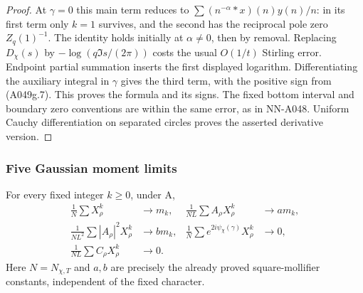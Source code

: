 \begin{proof}
At $\gamma=0$ this main term reduces to
$\sum (n^{-\alpha}*x)(n)y(n)/n$: in its first term only
$k=1$ survives, and the second has the reciprocal pole zero
$Z_q(1)^{-1}$. The identity holds initially at $\alpha\ne0$,
then by removal. Replacing $D_\chi(s)$ by
$-\log(q\Im s/(2\pi))$ costs the usual $O(1/t)$ Stirling
error. Endpoint partial summation inserts the first displayed
logarithm. Differentiating the auxiliary integral in $\gamma$
gives the third term, with the positive sign from (A049g.7).
This proves the formula and its signs. The fixed bottom interval
and boundary zero conventions are within the same error, as in
NN-A048. Uniform Cauchy differentiation on separated circles
proves the asserted derivative version.
\end{proof}

\subsubsection*{Five Gaussian moment limits}

\begin{lemma}
\label{lem:A049-gaussian-moments}
For every fixed integer $k\ge0$, under A,
\begin{align}
 \frac1N\sum X_\rho^k&\longrightarrow m_k,
 &\frac1{NL}\sum A_\rho X_\rho^k&\longrightarrow a m_k,
                                                        \tag{A049g.9}\\
 \frac1{NL^2}\sum |A_\rho|^2X_\rho^k&\longrightarrow b m_k,
 &\frac1N\sum e^{2i\psi_\chi(\gamma)}X_\rho^k&\longrightarrow0,
                                                        \tag{A049g.10}\\
 \frac1{NL}\sum C_\rho X_\rho^k&\longrightarrow0.&&
                                                        \tag{A049g.11}
\end{align}
Here $N=N_{\chi,T}$ and $a,b$ are precisely the already proved
square-mollifier constants, independent of the fixed character.
\end{lemma}

